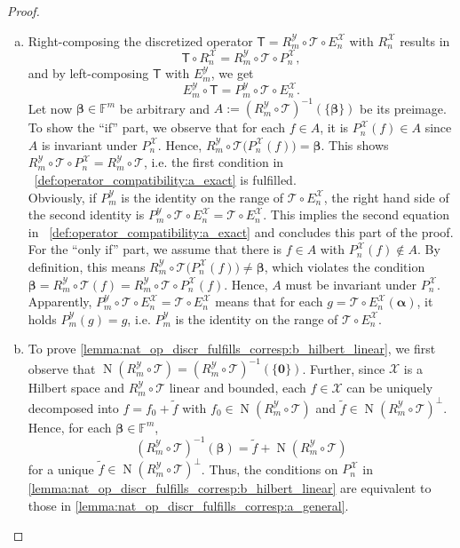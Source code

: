 \documentclass[a4paper]{paper}
\newcommand{\Spc}[1]{\mathscr{#1}}
\newcommand{\Field}{\mathbb{F}}
\newcommand{\Op}[1]{\mathcal{#1}}
\newcommand{\DiscOp}[1]{\mathsf{#1}}
\newcommand*{\EXT}[2]{\ensuremath{E_{#1}^{#2}}}
\newcommand*{\REST}[2]{\ensuremath{R_{#1}^{#2}}}
\newcommand*{\PROJ}[2]{\ensuremath{P_{#1}^{#2}}}
\newcommand*{\RnX}{\ensuremath{\REST{n}{\Spc{X}}}}
\newcommand*{\RmY}{\ensuremath{\REST{m}{\Spc{Y}}}}
\newcommand*{\EnX}{\ensuremath{\EXT{n}{\Spc{X}}}}
\newcommand*{\EmY}{\ensuremath{\EXT{m}{\Spc{Y}}}}
\newcommand*{\PnX}{\ensuremath{\PROJ{n}{\Spc{X}}}}
\newcommand*{\PmY}{\ensuremath{\PROJ{m}{\Spc{Y}}}}
\DeclareMathOperator{\nullspace}{N}
\newcommand{\vzero}{\boldsymbol{0}}
\newcommand{\valpha}{\boldsymbol{\alpha}}
\newcommand{\vbeta}{\boldsymbol{\beta}}
\begin{document}
\begin{proof}
 \begin{enumerate}[a)]
  \item Right-composing the discretized operator $\DiscOp{T} = \RmY \circ \Op{T} \circ \EnX$ with $\RnX$ results in
  \begin{equation*}
   \DiscOp{T} \circ \RnX = \RmY \circ \Op{T} \circ \PnX,
  \end{equation*}
  and by left-composing $\DiscOp{T}$ with $\EmY$, we get
  \begin{equation*}
   \EmY \circ \DiscOp{T} = \PmY \circ \Op{T} \circ \EnX.
  \end{equation*}
  Let now $\vbeta \in \Field^m$ be arbitrary and $A := (\RmY \circ \Op{T})^{-1}(\{\vbeta\})$ be its preimage.
  To show the ``if'' part, we observe that for each $f \in A$, it is $\PnX(f) \in A$ since $A$ is invariant under 
  $\PnX$. Hence, $\RmY \circ \Op{T} \big( \PnX(f) \big) = \vbeta$. This shows 
  $\RmY \circ \Op{T} \circ \PnX = \RmY \circ \Op{T}$, i.e. the first condition 
  in ~\eqref{def:operator_compatibility:a_exact} is fulfilled.\\
  Obviously, if $\PmY$ is the identity on the range of $\Op{T} \circ \EnX$, the right hand side of the second identity 
  is $\PmY \circ \Op{T} \circ \EnX = \Op{T} \circ \EnX$. This implies the second equation in 
  ~\eqref{def:operator_compatibility:a_exact} and concludes this part of the proof.\\
  For the ``only if'' part, we assume that there is $f \in A$ with $\PnX(f) \not\in A$. By definition, this means 
  $\RmY \circ \Op{T} \big( \PnX(f) \big) \neq \vbeta$, which violates the condition
  $\vbeta = \RmY \circ \Op{T} (f) = \RmY \circ \Op{T} \circ \PnX (f)$. Hence, $A$ must be invariant under $\PnX$.\\
  Apparently, $\PmY \circ \Op{T} \circ \EnX = \Op{T} \circ \EnX$ means that for each $g = \Op{T} \circ \EnX(\valpha)$, 
  it holds $\PmY(g) = g$, i.e. $\PmY$ is the identity on the range of $\Op{T} \circ \EnX$.

  \item To prove \eqref{lemma:nat_op_discr_fulfills_corresp:b_hilbert_linear}, we first observe that 
  $\nullspace(\RmY \circ \Op{T}) = (\RmY \circ \Op{T})^{-1}(\{\vzero\})$. Further, since $\Spc{X}$ is a Hilbert space 
  and $\RmY \circ \Op{T}$ linear and bounded, each $f \in \Spc{X}$ can be uniquely decomposed into 
  $f = f_0 + \tilde f$ with  $f_0 \in \nullspace(\RmY \circ \Op{T})$ and 
  $\tilde f \in \nullspace(\RmY \circ \Op{T})^\perp$. Hence, for each $\vbeta \in \Field^m$,
  \begin{equation*}
   (\RmY \circ \Op{T})^{-1}({\vbeta}) = \tilde f + \nullspace(\RmY \circ \Op{T})
  \end{equation*}
  for a unique $\tilde f \in \nullspace(\RmY \circ \Op{T})^\perp$. Thus, the conditions on $\PnX$ in 
  \eqref{lemma:nat_op_discr_fulfills_corresp:b_hilbert_linear} are equivalent to those in   
  \eqref{lemma:nat_op_discr_fulfills_corresp:a_general}.
  

\end{enumerate}
\end{proof}
\end{document}
